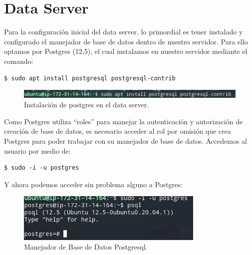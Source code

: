 \documentclass{article}
\begin{document}


\section{Data Server}

Para la configuración inicial del data server, lo primordial
es tener instalado y configurado el manejador de base de datos
dentro de nuestro servidor. Para ello optamos por Postgres
(12.5), el cual instalamos en nuestro servidor mediante el
comando:

\begin{lstlisting}
$ sudo apt install postgresql postgresql-contrib
\end{lstlisting}

\begin{figure}[H]
  \centering
  \includegraphics[width=\textwidth]{DATASERVER/exhibitA}
  \caption{Instalación de postgres en el data server.}
  \label{fig:DATASERVER-A}
\end{figure}

Como Postgres utiliza ``roles'' para manejar la autenticación y
autorización de creación de base de datos, es necesario acceder
al rol por omisión que crea Postgres para poder trabajar con su
manejador de base de datos. Accedemos al usuario por medio de:

\begin{lstlisting}
$ sudo -i -u postgres
\end{lstlisting}

Y ahora podemos acceder sin problema alguno a Postgres:

\begin{figure}[H]
  \centering
  \includegraphics[width=0.8\textwidth]{DATASERVER/exhibitB}
  \caption{Manejador de Base de Datos Postgresql.}
  \label{fig:DATASERVER-B}
\end{figure}
\end{document}
